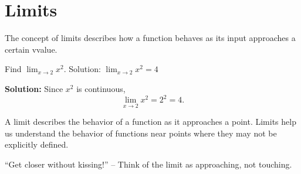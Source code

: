\documentclass[11pt]{article}
\begin{document}
\section*{Limits}
The concept of limits describes  how a function behaves as its input approaches a certain vvalue.

\begin{examplebox}
Find \( \lim_{x \to 2} x^2 \).  
Solution: \( \lim_{x \to 2} x^2 = 4 \)

\textbf{Solution:}  
Since \(x^2\) is continuous,  
\[
\lim_{x \to 2} x^2 = 2^2 = 4.
\]



\end{examplebox}

\begin{keynotebox}
A limit describes the behavior of a function as it approaches a point.
Limits help us understand the behavior of functions near points where they may not be explicitly defined.
\end{keynotebox}

\begin{funbox}
“Get closer without kissing!” – Think of the limit as approaching, not touching.
\end{funbox}
\end{document}
